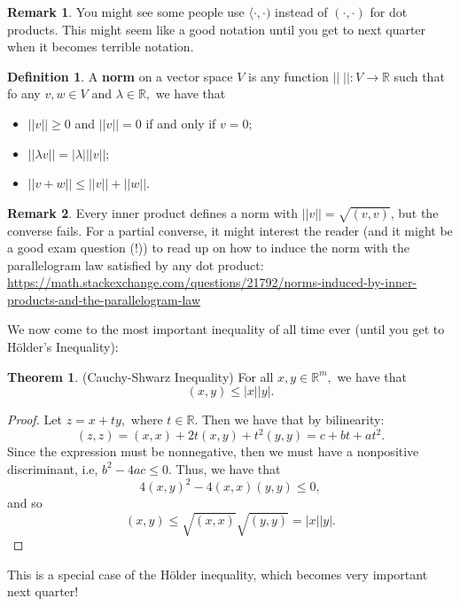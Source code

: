 \documentclass[10pt, oneside]{article}
\newcommand{\bbR}{\mathbb{R}}
\theoremstyle{definition}
\newtheorem{thm}{Theorem}
\newtheorem{defn}{Definition}
\newtheorem{rem}{Remark}
\begin{document}
\begin{rem}
    You might see some people use $\langle \cdot, \cdot)$ instead of $(\cdot,\cdot)$ for dot products. This might seem like a good notation until you get to next quarter when it becomes terrible notation.
\end{rem}
\begin{defn}
    A \textbf{norm} on a vector space $V$ is any function $||\;||: V \to \bbR$ such that fo any $v,w \in V$ and $\lambda \in \bbR,$ we have that 
    \begin{itemize}
        \item $||v||\geq 0$ and $||v|| = 0$ if and only if $v = 0;$
        \item $||\lambda v|| = |\lambda|||v||;$
        \item $||v + w||\leq ||v|| + ||w||.$
    \end{itemize}
\end{defn}
\begin{rem}
    Every inner product defines a norm with $||v|| = \sqrt{( v, v )}$, but the converse fails. For a partial converse, it might interest the reader (and it might be a good exam question (!)) to read up on how to induce the norm with the parallelogram law satisfied by any  dot product: 
    \url{https://math.stackexchange.com/questions/21792/norms-induced-by-inner-products-and-the-parallelogram-law}
\end{rem}
We now come to the most important inequality of all time ever (until you get to H\"older's Inequality):
\begin{thm}
    (Cauchy-Shwarz Inequality) For all $x,y \in \bbR^m,$ we have that 
    \[( x, y ) \leq |x||y|.\]
\end{thm}
\begin{proof}
    Let $z = x + ty,$ where $t\in \bbR.$ Then we have that by bilinearity:
    \[( z, z ) = ( x, x) + 2t( x, y) + t^2 ( y, y ) = c + bt + at^2.\] Since the expression must be nonnegative, then we must have a nonpositive discriminant, i.e, $b^2 - 4ac \leq 0.$ Thus, we have that 
    \[4 ( x, y )^2 - 4( x, x ) ( y, y ) \leq 0,\] and so 
    \[( x, y ) \leq \sqrt{( x, x )}\sqrt{( y, y )} = |x||y|.\]
\end{proof}
This is a special case of the H\"{o}lder inequality, which becomes very important next quarter!
\newpage
\end{document}
